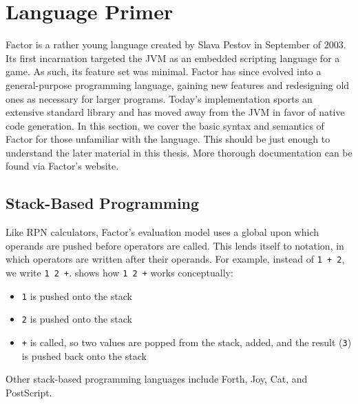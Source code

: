 \section{Language Primer}


Factor is a rather young language created by Slava Pestov in September of 2003.
Its first incarnation targeted the \gls{JVM} as an embedded scripting language
for a game.  As such, its feature set was minimal.  Factor has since evolved
into a general-purpose programming language, gaining new features and
redesigning old ones as necessary for larger programs.  Today's implementation
sports an extensive standard library and has moved away from the \gls{JVM} in
favor of native code generation.  In this section, we cover the basic syntax and semantics of Factor for those
unfamiliar with the language.  This should be just enough to understand the
later material in this thesis.  More thorough documentation
can be found via Factor's website.

\subsection{Stack-Based Programming}


Like \gls{RPN} calculators, Factor's evaluation model uses a global
 upon which operands are pushed before operators are called.  This
lends itself to  notation, in which operators are written after
their operands.  For example, instead of \texttt{1~+~2}, we write
\texttt{1~2~+}.   shows how \texttt{1~2~+} works conceptually:
\begin{itemize}
  \item \texttt{1} is pushed onto the stack
  \item \texttt{2} is pushed onto the stack
  \item \texttt{+} is called, so two values are popped from the stack, added,
        and the result (\texttt{3}) is pushed back onto the stack
\end{itemize}
Other stack-based programming languages include Forth,
Joy, Cat, and PostScript.

